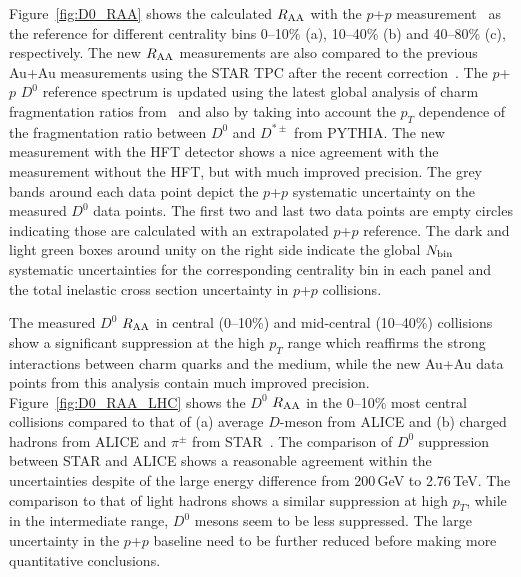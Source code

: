 \documentclass[%
 reprint,	
 amsmath,amssymb,
 aps,
 prc,
]{revtex4-1}
\begin{document}
Figure~\ref{fig:D0_RAA} shows the calculated $R_{\rm AA}$ with the $p$+$p$ measurement~\cite{Star_D_pp} as the reference for different centrality bins 0--10\% (a), 10--40\% (b) and 40--80\% (c), respectively. The new $R_{\rm AA}$ measurements are also compared to the previous Au+Au measurements using the STAR TPC after the recent correction~\cite{Star_D_RAA}. The $p$+$p$ $D^0$ reference spectrum is updated using the latest global analysis of charm fragmentation ratios from~\cite{charm_frag} and also by taking into account the $p_T$ dependence of the fragmentation ratio between $D^0$ and $D^{*\pm}$ from PYTHIA. The new measurement with the HFT detector shows a nice agreement with the measurement without the HFT, but with much improved precision. The grey bands around each data point depict the $p$+$p$ systematic uncertainty on the measured $D^0$ data points. The first two and last two data points are empty circles indicating those are calculated with an extrapolated $p$+$p$ reference. The dark and light green boxes around unity on the right side indicate the global $N_{\rm bin}$ systematic uncertainties for the corresponding centrality bin in each panel and the total inelastic cross section uncertainty in $p$+$p$ collisions.

The measured $D^0$ $R_{\rm AA}$ in central (0--10\%) and mid-central (10--40\%) collisions show a significant suppression at the high $p_{T}$ range which reaffirms the strong interactions between charm quarks and the medium, while the new Au+Au data points from this analysis contain much improved precision. Figure~\ref{fig:D0_RAA_LHC} shows the $D^0$ $R_{\rm AA}$ in the 0--10\% most central collisions compared to that of (a) average $D$-meson from ALICE and (b) charged hadrons from ALICE and $\pi^{\pm}$ from STAR~\cite{Alice_D_RAA_2,Alice_hadron_RAA,PhenixPi0}. The comparison of $D^0$ suppression between STAR and ALICE shows a reasonable agreement within the uncertainties despite of the large energy difference from 200\,GeV to 2.76\,TeV. The comparison to that of light hadrons shows a similar suppression at high $p_{T}$, while in the intermediate range, $D^0$ mesons seem to be less suppressed. The large uncertainty in the $p$+$p$ baseline need to be further reduced before making more quantitative conclusions.

\end{document}
